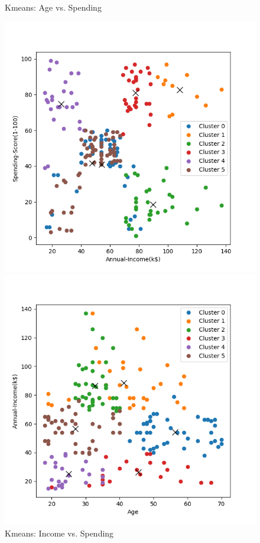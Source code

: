 \documentclass[8pt]{article}
\begin{document}
\begin{figure}[H]
\begin{minipage}{0.32\textwidth}
        \caption{Kmeans: Age vs. Spending}
        \label{fig: Age vs. Spending Score k6 rand14 com}
    \end{minipage}
    \hfill
    \begin{minipage}{0.32\textwidth}
        \centering
        \includegraphics[width=\textwidth]{./Prob4/out/task1_rand14/images/cluster_result_k6_1_2.png}
        \caption{Kmeans: Income vs. Spending}
        \label{fig: Annual Income vs. Spending Score k6 rand14 com}
    \end{minipage}
    \hfill
    \begin{minipage}{0.32\textwidth}
        \centering
        \includegraphics[width=\textwidth]{./Prob4/out/task2_rand14/images/cluster_result_k6_0_1.png}

\end{minipage}
\end{figure}
\end{document}
